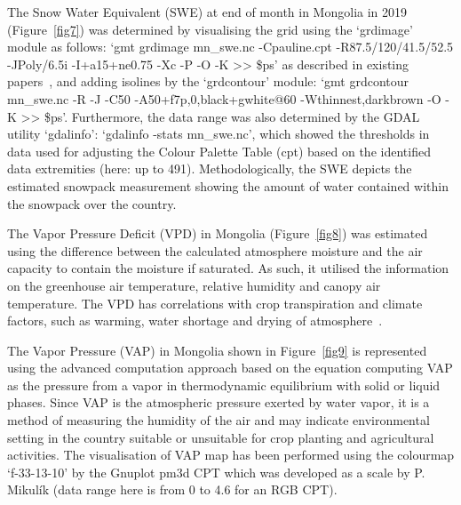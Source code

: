 \documentclass[geosciences,article,accept,pdftex,oneauthor]{Definitions/mdpi}
\begin{document}
The Snow Water Equivalent (SWE) at end of month in Mongolia in 2019 (Figure~\ref{fig7}) was determined by visualising the grid using the ‘grdimage’ module as follows: ‘gmt grdimage mn\_swe.nc -Cpauline.cpt -R87.5/120/41.5/52.5 -JPoly/6.5i -I+a15+ne0.75 -Xc -P -O -K >> \$ps’ as described in existing papers~\cite{Lemenkova2020l}, and adding isolines by the ‘grdcontour’ module: ‘gmt grdcontour mn\_swe.nc -R -J -C50 -A50+f7p,0,black+gwhite@60 -Wthinnest,darkbrown -O -K >> \$ps’. Furthermore, the data range was also determined by the GDAL utility ‘gdalinfo’: ‘gdalinfo -stats mn\_swe.nc’, which showed the thresholds in data used for adjusting the Colour Palette Table (cpt) based on the identified data extremities (here: up to 491). Methodologically, the SWE depicts the estimated snowpack measurement showing the amount of water contained within the snowpack over the country.

The Vapor Pressure Deficit (VPD) in Mongolia (Figure~\ref{fig8}) was estimated using the difference between the calculated atmosphere moisture and the air capacity to contain the moisture if saturated. As such, it utilised the information on the greenhouse air temperature, relative humidity and canopy air temperature. The VPD has correlations with crop transpiration and climate factors, such as warming, water shortage and drying of atmosphere~\cite{Ghanem,Lietal2021,Song}. 

The Vapor Pressure (VAP) in Mongolia shown in Figure~\ref{fig9} is represented using the advanced computation approach based on the equation computing VAP as the pressure from a vapor in thermodynamic equilibrium with solid or liquid phases. Since VAP is the atmospheric pressure exerted by water vapor, it is a method of measuring the humidity of the air and may indicate environmental setting in the country suitable or unsuitable for crop planting and agricultural activities. The visualisation of VAP map has been performed using the colourmap ‘f-33-13-10' by the Gnuplot pm3d CPT which was developed as a scale by P. Mikulík (data range here is from 0 to 4.6 for an RGB CPT). 
\end{document}
